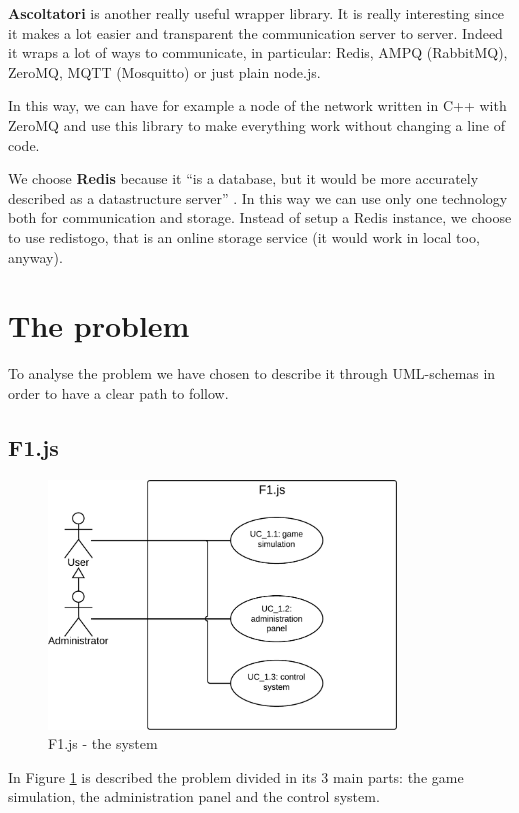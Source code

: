 \textbf{Ascoltatori} is another really useful wrapper library. It is really interesting since it makes a lot easier and transparent the communication server to server. Indeed it wraps a lot of ways to communicate, in particular: Redis, AMPQ (RabbitMQ), ZeroMQ, MQTT (Mosquitto) or just plain node.js.

In this way, we can have for example a node of the network written in C++ with ZeroMQ and use this library to make everything work without changing a line of code.

We choose \textbf{Redis} because it ``is a database, but it would be more accurately described as a datastructure server'' \cite{book:smashing}. In this way we can use only one technology both for communication and storage. Instead of setup a Redis instance, we choose to use redistogo, that is an online storage service (it would work in local too, anyway).

\section{The problem}
\label{sec:theProblem}

To analyse the problem we have chosen to describe it through UML-schemas in order to have a clear path to follow.

\subsection{F1.js}

\begin{figure}[H]
\centering %
\includegraphics[height=250px]{./img/UML/F1Js.png}
\caption{F1.js - the system}
\label{fig:F1jsUC}
\end{figure}

In Figure \ref{fig:F1jsUC} is described the problem divided in its 3 main parts: the game simulation, the administration panel and the control system.

